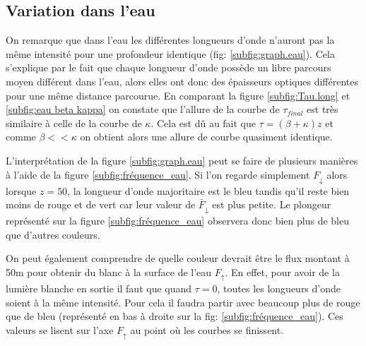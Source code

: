\documentclass[12pt]{article}
\begin{document}



\subsection{Variation dans l'eau}


On remarque que dans l'eau les différentes longueurs d'onde n'auront pas la même intensité pour une profondeur identique (fig: \ref{subfig:graph.eau}). Cela s'explique par le fait que chaque longueur d'onde possède un libre parcours moyen différent dans l'eau, alors elles ont donc des épaisseurs optiques différentes pour une même distance parcourue. En comparant la figure \ref{subfig:Tau.long} et \ref{subfig:eau beta kappa} on constate que l'allure de la courbe de $\tau_{final}$ est très similaire à celle de la courbe de $\kappa$. Cela est dû au fait que $\tau=(\beta+\kappa)z$ et comme $\beta<<\kappa$ on obtient alors une allure de courbe quasiment identique. \par
L'interprétation de la figure \ref{subfig:graph.eau} peut se faire de plusieurs manières à l'aide de la figure \ref{subfig:fréquence_eau}. Si l'on regarde simplement $F_{\downarrow}$ alors lorsque $z=50$, la longueur d'onde majoritaire est le bleu tandis qu'il reste bien moins de rouge et de vert car leur valeur de $\bar F_{\downarrow}$ est plus petite. Le plongeur représenté sur la figure \ref{subfig:fréquence_eau} observera donc bien plus de bleu que d'autres couleurs.\par
On peut également comprendre de quelle couleur devrait être le flux montant à 50m pour obtenir du blanc à la surface de l'eau $F_{\uparrow}$.
En effet, pour avoir de la lumière blanche en sortie il faut que quand $\tau=0$, toutes les longueurs d'onde soient à la même intensité. Pour cela il faudra partir avec beaucoup plus de rouge que de bleu (représenté en bas à droite sur la fig: \ref{subfig:fréquence_eau}). Ces valeurs se lisent sur l'axe $F_{\uparrow}$ au point où les courbes se finissent. 
\end{document}
